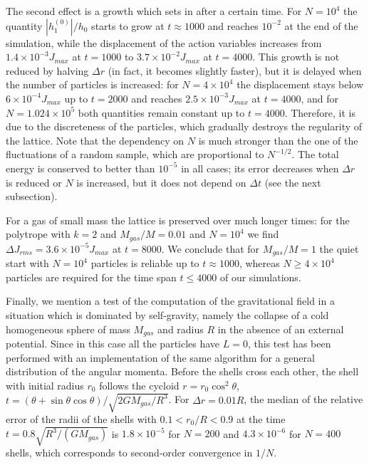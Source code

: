The second effect is a growth which sets in after a certain time. For $N = 10^4$ the quantity $|h_1^{(0)}|/h_0$ starts to grow at $t\approx 1000$ and reaches $10^{-2}$ at the end of the simulation, while the displacement of the action variables increases from $1.4\times 10^{-3} J_{max}$ at $t = 1000$ to $3.7\times 10^{-2} J_{max}$ at $t = 4000$. This growth is not reduced by halving $\Delta r$ (in fact, it becomes slightly faster), but it is delayed when the number of particles is increased: for $N = 4\times 10^4$ the displacement stays below $6\times 10^{-4} J_{max}$ up to $t = 2000$ and reaches $2.5\times 10^{-3} J_{max}$ at $t = 4000$, and for $N = 1.024\times 10^5$ both quantities remain constant up to $t = 4000$. Therefore, it is due to the discreteness of the particles, which gradually destroys the regularity of the lattice. Note that the dependency on $N$ is much stronger than the one of the fluctuations of a random sample, which are proportional to $N^{-1/2}$. The total energy is conserved to better than $10^{-5}$ in all cases; its error decreases when $\Delta r$ is reduced or $N$ is increased, but it does not depend on $\Delta t$ (see the next subsection).

For a gas of small mass the lattice is preserved over much longer times: for the polytrope with $k = 2$ and $M_{gas}/M = 0.01$ and $N = 10^4$ we find $\Delta J_{rms} = 3.6\times 10^{-5} J_{max}$ at $t = 8000$. We conclude that for $M_{gas}/M = 1$ the quiet start with $N = 10^4$ particles is reliable up to $t\approx 1000$, whereas $N\geq 4\times 10^4$ particles are required for the time span $t\leq 4000$ of our simulations.

Finally, we mention a test of the computation of the gravitational field in a situation which is dominated by self-gravity, namely the collapse of a cold homogeneous sphere of mass $M_{gas}$ and radius $R$ in the absence of an external potential. Since in this case all the particles have $L = 0$, this test has been performed with an implementation of the same algorithm for a general distribution of the angular momenta. Before the shells cross each other, the shell with initial radius $r_0$ follows the cycloid $r = r_0\cos^2\theta$, $t = (\theta + \sin\theta\cos\theta)/\sqrt{2GM_{gas}/R^3}$. For $\Delta r = 0.01 R$, the median of the relative error of the radii of the shells with $0.1 < r_0/R < 0.9$ at the time $t = 0.8\sqrt{R^3/(GM_{gas})}$ is $1.8\times 10^{-5}$ for $N = 200$ and $4.3\times 10^{-6}$ for $N = 400$ shells, which corresponds to second-order convergence in $1/N$.


